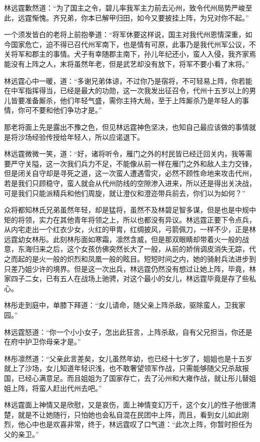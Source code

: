 林远霆歉然道：“为了国主之令，碧儿率我军主力前去沁州，致令代州局势严峻至此，远霆惭愧。齐兄弟，你本已解甲归田，如今又要披挂上阵，为兄对你不起。”

一个须发皆白的老将上前抱拳道：“将军休要这样说，国主对我代州恩情深重，如今国家危亡，迫不得已召代州军南下，也是情有可原，此事乃是我代州军公议，不关将军和郡主的事情。犬子有幸随郡主南下，孙儿年纪还小，蛮人入侵，我齐家焉能没有上阵之人，末将虽然年老，但是武艺却没有放下，将军不要小看了末将。”

林远霆心中一暖，道：“多谢兄弟体谅，不过你乃是宿将，不可轻易上阵，你若能在中军指挥得当，已经是最大的功勋，这一次我发出征召令，代州十五岁以上的男儿皆要准备厮杀，他们年轻气盛，需你主持大局，至于上阵厮杀乃是年轻人的事情，你可不要和他们争功才是。”

那老将面上先是露出不豫之色，但见林远霆神色坚决，也知自己最应该做的事情就是将沙场经验传授给年轻人，所以应诺退下。

林远霆微微一笑，道：“好，诸将听令，雁门之外的村民皆已经迁回关内，我等需要严守关隘，这一次我们兵力不足，不能像从前一样在雁门之外和敌人主力交锋，但是闭关自守却是寻死之道，这一次蛮人遭遇雪灾，必然不顾性命地来攻击代州，若是我们只顾稳守，蛮人就会从代州防线的空隙渗入进来，所以还是得出关决战，可是我们只能派精兵和他们周旋，就让澄仪和澄迩带兵前去，你们以为如何？”

众将都知林氏兄弟虽然年轻，却是猛将，虽然不及林碧足智多谋，但是也是中规中矩的将领，实力在其他青年将领之上，所以也都没有异议。林远霆正要下令点兵，从内宅走出一个红衣少女，火红的甲胄，红绸披风，弓箭佩刀，一样不少，正是林远霆幼女林彤。此刻林彤面如寒霜，凛然含威，但是那双眼睛却带着火一般的战意，东海归来之后，这个女孩仿佛突然长大了一般，从前的娇俏调皮消失无踪，代之而起的是火一般的炽烈和凤凰一般的眩目。短短时间之内，她的骑射兵法进步到只差乃姐少许的境界。但是这一次出兵，林远霆仍然没有想过让她上阵，毕竟，林家四子二女，已有五人在战场上驰骋，对这个最小的女儿，林远霆毕竟是存了些私心。

林彤走到庭中，单膝下拜道：“女儿请命，随父亲上阵杀敌，驱除蛮人，卫我家园。”

林远霆怒道：“你一个小小女子，怎出此狂言，上阵杀敌，自有父兄担当，你还是在府中护卫你母亲才是。”

林彤凛然道：“父亲此言差矣，女儿虽然年幼，也已经十七岁了，姐姐也是十五岁就上了沙场，女儿知道年轻识浅，也不敢奢望领军作战，只需能够随父兄杀敌报国，已经心满意足。而且姐姐为了国家存亡，去了沁州和大雍作战，就让彤儿替姐姐上阵，将蛮人赶出代州去吧。”

林远霆面上神情又是欣慰，又是哀伤，面上神情变幻万千，这个女儿的性子他很清楚，就是不让她随行，只怕她也会私自混在民团中上阵，而且，看到女儿如此刚烈，他心中也是欢喜非常，终于，林远霆叹了口气道：“此次上阵，你暂时担任为父的亲卫。”

